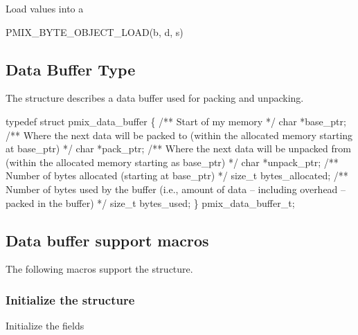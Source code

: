 Load values into a 

\cspecificstart
\begin{codepar}
PMIX_BYTE_OBJECT_LOAD(b, d, s)
\end{codepar}
\cspecificend

\begin{arglist}
\end{arglist}


\subsection{Data Buffer Type}

The  structure describes a data buffer used for packing and unpacking.

\cspecificstart
\begin{codepar}
typedef struct pmix_data_buffer \{
    /** Start of my memory */
    char *base_ptr;
    /** Where the next data will be packed to (within the allocated
        memory starting at base_ptr) */
    char *pack_ptr;
    /** Where the next data will be unpacked from (within the
        allocated memory starting as base_ptr) */
    char *unpack_ptr;
    /** Number of bytes allocated (starting at base_ptr) */
    size_t bytes_allocated;
    /** Number of bytes used by the buffer (i.e., amount of data --
        including overhead -- packed in the buffer) */
    size_t bytes_used;
\} pmix_data_buffer_t;
\end{codepar}
\cspecificend

\subsection{Data buffer support macros}
The following macros support the  structure.

\subsubsection{Initialize the  structure}

Initialize the  fields


